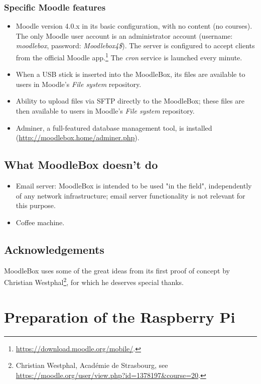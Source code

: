 \documentclass[12pt]{article}
\begin{document}
\subsubsection{Specific Moodle features}
\begin{itemize}
\item Moodle version 4.0.x in its basic configuration, with no content (no courses).
The only Moodle user account is an administrator account (username: \emph{moodlebox}, password: \emph{Moodlebox4\$}).
The server is configured to accept clients from the official Moodle app.\footnote{\url{https://download.moodle.org/mobile/}.} The \textsl{cron} service is launched every minute.
\item When a USB stick is inserted into the MoodleBox, its files are available to users in Moodle's \textsl{File system} repository.
\item Ability to upload files via SFTP directly to the MoodleBox; these files are then available to users in Moodle's \textsl{File system} repository.
\item Adminer, a full-featured database management tool, is installed (\url{http://moodlebox.home/adminer.php}).
\end{itemize}

\subsection{What MoodleBox doesn't do}

\begin{itemize}
\item Email server: MoodleBox is intended to be used "in the field", independently of any network infrastructure; email server functionality is not relevant for this purpose.
\item Coffee machine.
\end{itemize}

\subsection{Acknowledgements}

MoodleBox uses some of the great ideas from its first proof of concept by Christian Westphal\footnote{Christian Westphal, Académie de Strasbourg, see \url{https://moodle.org/user/view.php?id=1378197&course=20}.}, for which he deserves special thanks.

\section{Preparation of the Raspberry Pi}
\end{document}
